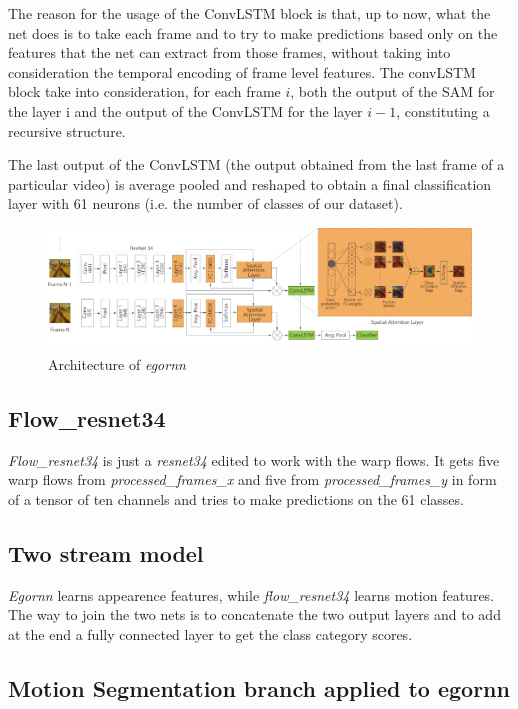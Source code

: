 \documentclass[10pt,twocolumn,hidelinks,letterpaper]{article}
\begin{document}
The reason for the usage of the ConvLSTM block is that, up to now, what the net does is to take each frame and to try to make predictions based only on the features that the net can extract from those frames, without taking into consideration the temporal encoding of frame level features. The convLSTM block take into consideration, for each frame $i$, both the output of the SAM for the layer i and the output of the ConvLSTM for the layer $i-1$, constituting a recursive structure.

The last output of the ConvLSTM (the output obtained from the last frame of a particular video) is average pooled and reshaped to obtain a final classification layer with 61 neurons (i.e. the number of classes of our dataset).

\begin{figure}
	\centering
	\includegraphics[width=\linewidth]{images/egornn.png}
	\caption{Architecture of \textit{egornn}}
	\label{egornn_arch}
\end{figure}

\subsection{Flow\_resnet34}

\textit{Flow\_resnet34} is just a \textit{resnet34} edited to work with the warp flows. It gets five warp flows from \textit{processed\_frames\_x} and five from \textit{processed\_frames\_y} in form of a tensor of ten channels and tries to make predictions on the 61 classes.

\subsection{Two stream model}

\textit{Egornn} learns appearence features, while \textit{flow\_resnet34} learns motion features. The way to join the two nets is to concatenate the two output layers and to add at the end a fully connected layer to get the class category scores.

\subsection{Motion Segmentation branch applied to egornn}
\end{document}
